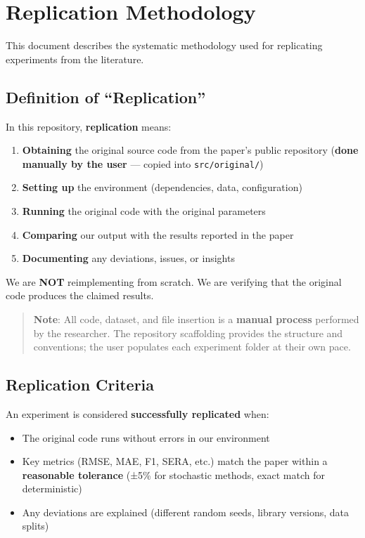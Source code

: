 \section{Replication Methodology}\label{replication-methodology}

This document describes the systematic methodology used for replicating
experiments from the literature.

\subsection{Definition of
``Replication''}\label{definition-of-replication}

In this repository, \textbf{replication} means:

\begin{enumerate}
\def\labelenumi{\arabic{enumi}.}
\tightlist
\item
  \textbf{Obtaining} the original source code from the paper's public
  repository (\textbf{done manually by the user} --- copied into
  \texttt{src/original/})
\item
  \textbf{Setting up} the environment (dependencies, data,
  configuration)
\item
  \textbf{Running} the original code with the original parameters
\item
  \textbf{Comparing} our output with the results reported in the paper
\item
  \textbf{Documenting} any deviations, issues, or insights
\end{enumerate}

We are \textbf{NOT} reimplementing from scratch. We are verifying that
the original code produces the claimed results.

\begin{quote}
\small \textbf{Note}: All code, dataset, and file insertion is a \textbf{manual
process} performed by the researcher. The repository scaffolding
provides the structure and conventions; the user populates each
experiment folder at their own pace.
\end{quote}

\subsection{Replication Criteria}\label{replication-criteria}

An experiment is considered \textbf{successfully replicated} when:

\begin{itemize}
\tightlist
\item
  The original code runs without errors in our environment
\item
  Key metrics (RMSE, MAE, F1, SERA, etc.) match the paper within a
  \textbf{reasonable tolerance} (±5\% for stochastic methods, exact
  match for deterministic)
\item
  Any deviations are explained (different random seeds, library
  versions, data splits)
\end{itemize}


